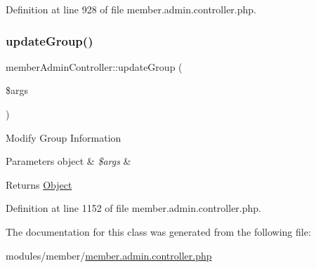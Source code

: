 Definition at line 928 of file member.\+admin.\+controller.\+php.

\hypertarget{classmemberAdminController_a7a0ee41a6c2feb436959ab1fcfbb0c7c}{}\label{classmemberAdminController_a7a0ee41a6c2feb436959ab1fcfbb0c7c} 
\subsubsection{\texorpdfstring{update\+Group()}{updateGroup()}}
{\footnotesize\ttfamily member\+Admin\+Controller\+::update\+Group (\begin{DoxyParamCaption}\item[{}]{\$args }\end{DoxyParamCaption})}

Modify Group Information 
\begin{DoxyParams}[1]{Parameters}
object & {\em \$args} & \\
\hline
\end{DoxyParams}
\begin{DoxyReturn}{Returns}
\hyperlink{classObject}{Object} 
\end{DoxyReturn}


Definition at line 1152 of file member.\+admin.\+controller.\+php.



The documentation for this class was generated from the following file\+:\begin{DoxyCompactItemize}
\item 
modules/member/\hyperlink{member_8admin_8controller_8php}{member.\+admin.\+controller.\+php}\end{DoxyCompactItemize}
